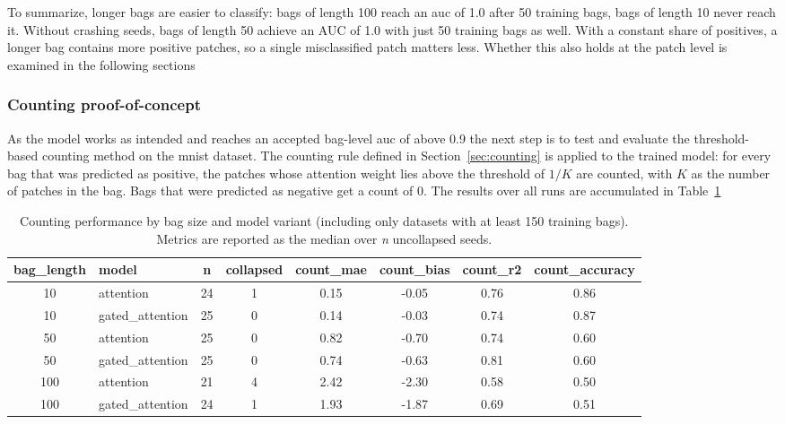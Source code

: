 \documentclass[12pt,parskip = half, DIV=classic,listof=totoc]{scrartcl}
\begin{document}
			To summarize, longer bags are easier to classify: bags of length 100 reach an \ac{auc} of 1.0 after 50 training bags, 
			bags of length 10 never reach it. Without crashing seeds, bags of length 50 achieve an
			AUC of 1.0 with just 50 training bags as well. With a constant share of positives, a longer bag contains more positive patches, 
			so a single misclassified patch matters less. Whether this also holds at the patch level is examined in the following sections

		\subsubsection{Counting proof-of-concept}\label{sec:mnist_count}
			As the model works as intended and reaches an accepted bag-level \ac{auc} of above 0.9 the next step is to test and evaluate the threshold-based counting
			method on the \ac{mnist} dataset. The counting rule defined in Section~\ref{sec:counting} is applied to the trained model:
			for every bag that was predicted as positive, the patches whose attention weight lies above the threshold of $1/K$ are counted, with $K$ as the number of patches
			in the bag. Bags that were predicted as negative get a count of 0. The results over all runs are accumulated in Table~\ref{tab:counting-core}
			
			\begin{table}[htbp]
				\centering
				\small
				\begin{tabular}{clcccccc}
					\toprule
					bag\_length & model & n & collapsed & count\_mae & count\_bias & count\_r2 & count\_accuracy \\
					\midrule
					10 & attention & 24 & 1 & 0.15 & -0.05 & 0.76 & 0.86 \\
					10 & gated\_attention & 25 & 0 & 0.14 & -0.03 & 0.74 & 0.87 \\
					\midrule
					50 & attention & 25 & 0 & 0.82 & -0.70 & 0.74 & 0.60 \\
					50 & gated\_attention & 25 & 0 & 0.74 & -0.63 & 0.81 & 0.60 \\
					\midrule
					100 & attention & 21 & 4 & 2.42 & -2.30 & 0.58 & 0.50 \\
					100 & gated\_attention & 24 & 1 & 1.93 & -1.87 & 0.69 & 0.51 \\
					\bottomrule
				\end{tabular}
				\caption[Counting performance by bag size and model variants]{Counting performance 
						by bag size and model variant (including only datasets with at least 150 training bags). Metrics are reported as the median over
						\emph{n} uncollapsed seeds.}
				\label{tab:counting-core}
			\end{table}
\end{document}
